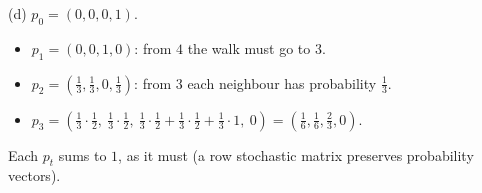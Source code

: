 \begin{exercisebox}
\begin{wsolution}
    (d) $p_0 = (0, 0, 0, 1)$.
    \begin{itemize}
        \item $p_1 = (0, 0, 1, 0)$: from $4$ the walk must go to $3$.
        \item $p_2 = \left(\frac{1}{3}, \frac{1}{3}, 0, \frac{1}{3}\right)$: from $3$ each
              neighbour has probability $\frac{1}{3}$.
        \item $p_3 = \left(\frac{1}{3} \cdot \frac{1}{2},\ \frac{1}{3} \cdot \frac{1}{2},\
                  \frac{1}{3} \cdot \frac{1}{2} + \frac{1}{3} \cdot \frac{1}{2} + \frac{1}{3} \cdot 1,\ 0\right)
                  = \left(\frac{1}{6}, \frac{1}{6}, \frac{2}{3}, 0\right)$.
    \end{itemize}
    Each $p_t$ sums to $1$, as it must (a row stochastic matrix preserves probability vectors).
\end{wsolution}
\end{exercisebox}
